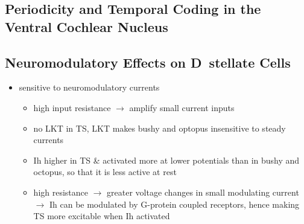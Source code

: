 \subsection{Periodicity and Temporal Coding in the Ventral Cochlear Nucleus}






\subsection{Neuromodulatory Effects on D~stellate Cells}




\begin{itemize}
\item sensitive to neuromodulatory currents \citep{FujinoOertel:2001}
\begin{itemize}
\item high input resistance $\rightarrow$ amplify small current inputs \citep{FujinoOertel:2001}
\item no LKT in TS,  LKT makes bushy and optopus insensitive to steady currents \citep{OertelFujino:2001,McGinleyOertel:2006}
\item Ih higher in TS \& activated more at lower potentials than in bushy and octopus, so that it is less active at rest
\item high resistance $\rightarrow$ greater voltage changes in small modulating current $\rightarrow$ Ih can be modulated by G-protein coupled receptors, hence making TS more excitable when Ih activated \citep{RodriguesOertel:2006}
\end{itemize}
\end{itemize}

